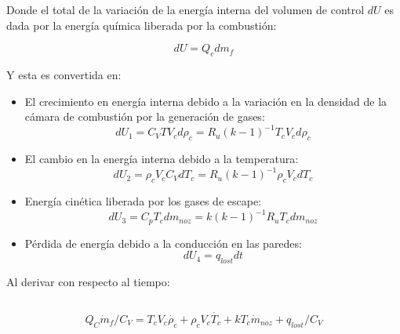 \documentclass[12pt]{article}
\begin{document}
Donde el total de la variación de la energía interna del volumen de control $dU$ es dada por la energía química liberada por la combustión:

\begin{equation}
  d U=Q_{c} d m_{f}
\end{equation}

Y esta es convertida en:

\begin{itemize}
  \item El crecimiento en energía interna debido a la variación en la densidad de la cámara de combustión por la generación de gases:
  \begin{equation}
    d U_{1}=C_{V} T V_{c} d \rho_{c}=R_{u}(k-1)^{-1} T_{c} V_{c} d \rho_{c}
  \end{equation}
  \item El cambio en la energía interna debido a la temperatura:
  \begin{equation}
    d U_{2}=\rho_{c} V_{c} C_{V} d T_{c}=R_{u}(k-1)^{-1} \rho_{c} V_{c} d T_{c}
  \end{equation}
  \item Energía cinética liberada por los gases de escape:
  \begin{equation}
    d U_{3} = C_{p} T_{c} d m_{noz} = k(k-1)^{-1} R_{u} T_{c} d m_{noz}
  \end{equation}
  \item Pérdida de energía debido a la conducción en las paredes:
  \begin{equation}
    d U_{4}=q_{lost} dt
  \end{equation}
\end{itemize}

Al derivar con respecto al tiempo:

\begin{equation}

\end{equation}

\begin{equation}
  Q_{C} \dot{m}_{f} / C_{V}=T_{c} V_{c} \dot{\rho_{c}}+\rho_{c} V_{c} \dot{T_{c}}+k T_{c} \dot{m}_{noz}+q_{lost} / C_{V}
\end{equation}

\end{document}
